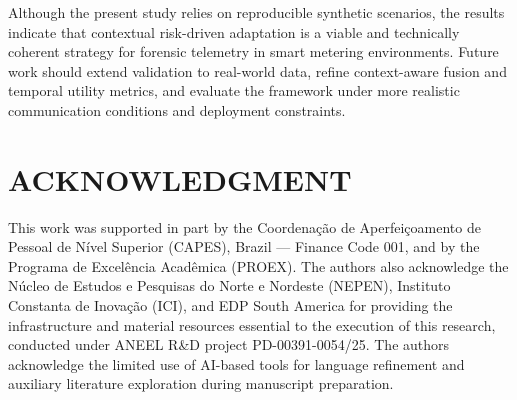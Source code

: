 \documentclass[journal]{IEEEtran}
\begin{document}
Although the present study relies on reproducible synthetic scenarios, the results indicate that contextual risk-driven adaptation is a viable and technically coherent strategy for forensic telemetry in smart metering environments. Future work should extend validation to real-world data, refine context-aware fusion and temporal utility metrics, and evaluate the framework under more realistic communication conditions and deployment constraints.


\section*{ACKNOWLEDGMENT}
This work was supported in part by the Coordenação de Aperfeiçoamento de Pessoal de Nível Superior (CAPES), Brazil — Finance Code 001, and by the Programa de Excelência Acadêmica (PROEX). The authors also acknowledge the Núcleo de Estudos e Pesquisas do Norte e Nordeste (NEPEN), Instituto Constanta de Inovação (ICI), and EDP South America for providing the infrastructure and material resources essential to the execution of this research, conducted under ANEEL R\&D project PD-00391-0054/25. The authors acknowledge the limited use of AI-based tools for language refinement and auxiliary literature exploration during manuscript preparation.

\end{document}
